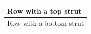 \documentclass{article}
\begin{document}
\begin{tabular}{|l|}
\hline
Row with a top strut\bigstrut[t]\\
\hline
Row with a bottom strut\bigstrut[b]\\
\hline
\end{tabular}
\end{document}
